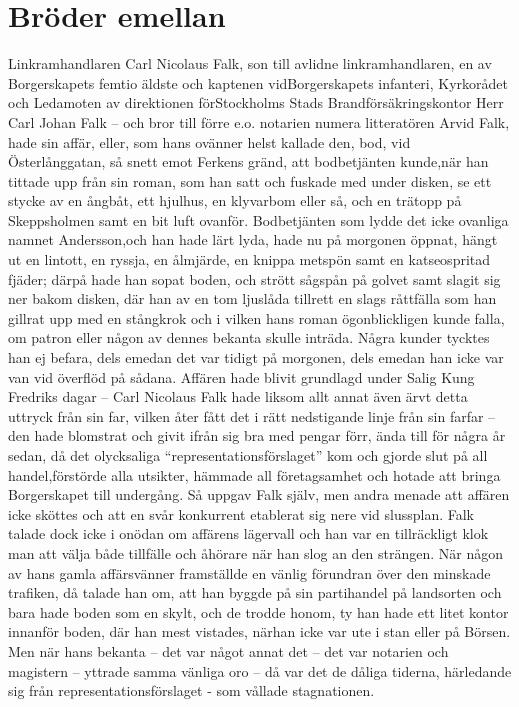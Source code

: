 \documentclass[%
	]{scrartcl}
\begin{document}
\section{Bröder emellan}
Linkramhandlaren Carl Nicolaus Falk, son till avlidne linkramhandlaren, en av 
Borgerskapets femtio äldste och kaptenen vidBorgerskapets infanteri, Kyrkorådet 
och Ledamoten av direktionen förStockholms Stads Brandförsäkringskontor Herr 
Carl Johan Falk -- och bror till förre e.o. notarien numera litteratören Arvid 
Falk, hade sin affär, eller, som hans ovänner helst kallade den, bod, vid 
Österlånggatan, så snett emot Ferkens gränd, att bodbetjänten kunde,när han 
tittade upp från sin roman, som han satt och fuskade med under disken, se ett 
stycke av en ångbåt, ett hjulhus, en klyvarbom eller så, och en trätopp på 
Skeppsholmen samt en bit luft ovanför. Bodbetjänten som lydde det icke ovanliga 
namnet Andersson,och han hade lärt lyda, hade nu på morgonen öppnat, hängt ut 
en lintott, en ryssja, en ålmjärde, en knippa metspön samt en katseospritad 
fjäder; därpå hade han sopat boden, och strött sågspån på golvet samt slagit 
sig ner bakom disken, där han av en tom ljuslåda tillrett en slags råttfälla 
som han gillrat upp med en stångkrok och i vilken hans roman ögonblickligen 
kunde falla, om patron eller någon av dennes bekanta skulle inträda. Några 
kunder tycktes han ej befara, dels emedan det var tidigt på morgonen, dels 
emedan han icke var van vid överflöd på sådana. Affären hade blivit grundlagd 
under Salig Kung Fredriks dagar -- Carl Nicolaus Falk hade liksom allt annat 
även ärvt detta uttryck från sin far, vilken åter fått det i rätt nedstigande 
linje från sin farfar -- den hade blomstrat och givit ifrån sig bra med pengar 
förr, ända till för några år sedan, då det olycksaliga 
``representationsförslaget'' kom och gjorde slut på all handel,förstörde alla 
utsikter, hämmade all företagsamhet och hotade att bringa Borgerskapet till 
undergång. Så uppgav Falk själv, men andra menade att affären icke sköttes och 
att en svår konkurrent etablerat sig nere vid slussplan. Falk talade dock icke 
i onödan om affärens lägervall och han var en tillräckligt klok man att välja 
både tillfälle och åhörare när han slog an den strängen. När någon av hans 
gamla affärsvänner framställde en vänlig förundran över den minskade trafiken, 
då talade han om, att han byggde på sin partihandel på landsorten och bara hade 
boden som en skylt, och de trodde honom, ty han hade ett litet kontor innanför 
boden, där han mest vistades, närhan icke var ute i stan eller på Börsen. Men 
när hans bekanta -- det var något annat det -- det var notarien och magistern 
-- yttrade samma vänliga oro -- då var det de dåliga tiderna, härledande sig 
från representationsförslaget - som vållade stagnationen.
\end{document}
